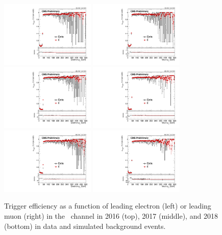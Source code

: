 \begin{figure}[hbtp]
\centering
\includegraphics[width=0.4\textwidth]{figures/corrections/trig_eff/emu_2016/electronLeadingPt.pdf}
\includegraphics[width=0.4\textwidth]{figures/corrections/trig_eff/emu_2016/muonLeadingPt.pdf}
\includegraphics[width=0.4\textwidth]{figures/corrections/trig_eff/emu_2017/electronLeadingPt.pdf}
\includegraphics[width=0.4\textwidth]{figures/corrections/trig_eff/emu_2017/muonLeadingPt.pdf}
\includegraphics[width=0.4\textwidth]{figures/corrections/trig_eff/emu_2018/electronLeadingPt.pdf}
\includegraphics[width=0.4\textwidth]{figures/corrections/trig_eff/emu_2018/muonLeadingPt.pdf}
\caption{Trigger efficiency as a function of leading electron (left) or leading muon (right) \pt in the \Pe\Pgm\ channel in 2016 (top), 2017 (middle), and 2018 (bottom) in data and simulated background \ttbar events.}
\label{trig_eff_emu}
\end{figure}